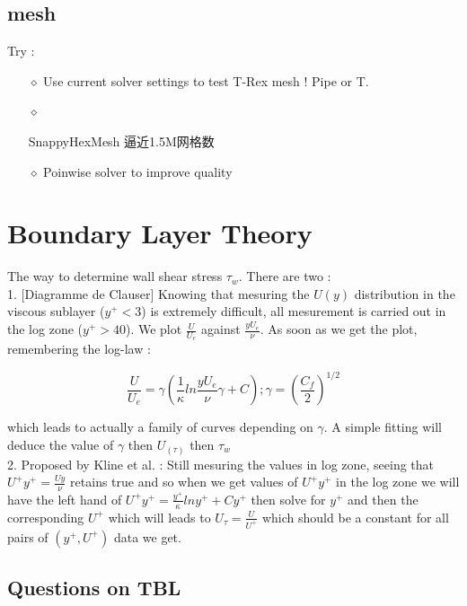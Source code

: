 \documentclass[a4paper,10pt]{article}
\begin{document}
\subsection{mesh}
Try : \\
\begin{itemize}
\item[$\diamond$] Use current solver settings to test T-Rex mesh ! Pipe or T.

\item[$\diamond$] \begin{CJK*}{UTF8}{gkai} SnappyHexMesh 逼近1.5M网格数 \end{CJK*} 

\item[$\diamond$] Poinwise solver to improve quality

\end{itemize}

\section{Boundary Layer Theory}

The way to determine wall shear stress $\tau_w$. There are two : \\

1. [Diagramme de Clauser] Knowing that mesuring the $U(y)$ distribution in the viscous sublayer ($y^+ < 3$) is extremely difficult, all mesurement is carried out in the log zone ($y^+ > 40$). We plot $\frac{U}{U_e}$ against $\frac{yU_e}{\nu}$. As soon as we get the plot, remembering the log-law :

$$\frac{U}{U_e} = \gamma (\frac{1}{\kappa} ln\frac{yU_e}{\nu}\gamma + C); \gamma = (\frac{C_f}{2})^{1/2}$$

which leads to actually a family of curves depending on $\gamma$. A simple fitting will deduce the value of $\gamma$ then $U_(\tau)$ then $\tau_w$ \\

2. Proposed by Kline et al. \cite{Kline1967}: Still mesuring the values in log zone, seeing that $U^+ y^+ = \frac{Uy}{\nu}$ retains true and  so when we get values of $U^+ y^+$ in the log zone we will have the left hand of $U^+ y^+ = \frac{y^+}{\kappa}lny^+ + Cy^+$ then solve for $y^+$ and then the corresponding $U^+$ which will leads to $U_\tau = \frac{U}{U^+}$ which should be a constant for all pairs of $(y^+, U^+)$ data we get. \\

\subsection{Questions on TBL}
\end{document}
